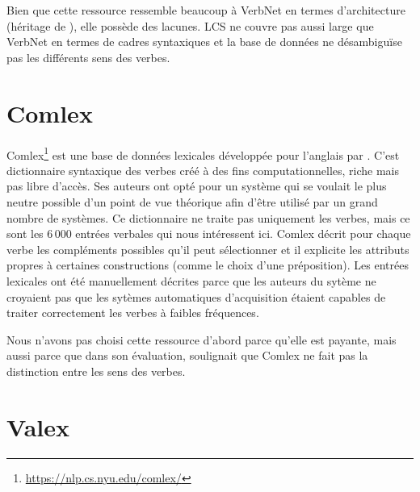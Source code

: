 Bien que cette ressource ressemble beaucoup à VerbNet en termes d'architecture (héritage de \cite{verb-classes.levin.1993}), elle possède des lacunes. \ac{LCS} ne couvre pas aussi large que VerbNet en termes de cadres syntaxiques et la base de données ne désambiguïse pas les différents sens des verbes.


\section{Comlex}\label{comlex}

Comlex\footnote{\url{https://nlp.cs.nyu.edu/comlex/}} est une base de données lexicales développée pour l'anglais par \cite{Grishman:1994:CSB:991886.991931}. C'est dictionnaire syntaxique des verbes créé à des fins computationnelles, riche mais pas libre d'accès. Ses auteurs ont opté pour un système qui se voulait le plus neutre possible d'un point de vue théorique afin d'être utilisé par un grand nombre de systèmes. Ce dictionnaire ne traite pas uniquement les verbes, mais ce sont les 6\,000 entrées verbales qui nous intéressent ici. Comlex décrit pour chaque verbe les compléments possibles qu'il peut sélectionner et il explicite les attributs propres à certaines constructions (comme le choix d'une préposition). Les entrées lexicales ont été manuellement décrites parce que les auteurs du sytème ne croyaient pas que les sytèmes automatiques d'acquisition étaient capables de traiter correctement les verbes à faibles fréquences.

Nous n'avons pas choisi cette ressource d'abord parce qu'elle est payante, mais aussi parce que dans son évaluation, \cite{SchulerVerbnetBroadcoverageComprehensive2005} soulignait que Comlex ne fait pas la distinction entre les sens des verbes.

\section{Valex}
 
